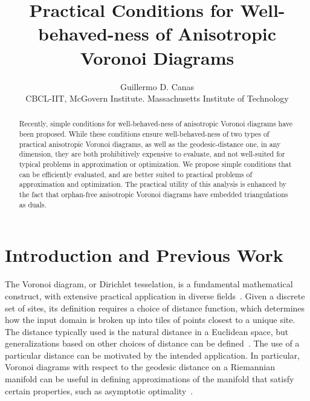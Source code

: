 \documentclass[11pt]{article}
\title{Practical Conditions for Well-behaved-ness of Anisotropic Voronoi Diagrams}
\author{Guillermo D. Canas\\
CBCL-IIT, McGovern Institute.
Massachusetts Institute of Technology\\
}
\date{}
\begin{document}
\maketitle


\begin{abstract}
Recently, simple conditions for well-behaved-ness of anisotropic Voronoi diagrams have been proposed. 
While these conditions ensure well-behaved-ness of two types of practical anisotropic Voronoi diagrams, as well as the geodesic-distance one, 
in any dimension, 
they are both prohibitively expensive to evaluate, and not well-suited for typical problems in approximation or optimization. 
We propose simple conditions that can be efficiently evaluated, and are better suited to practical problems of approximation and optimization. The practical utility of this analysis is enhanced by the fact that orphan-free anisotropic Voronoi diagrams have embedded triangulations as duals. 
\end{abstract}



\section{Introduction and Previous Work}



The Voronoi diagram, or Dirichlet tesselation, is a fundamental mathematical construct, with extensive practical application in diverse fields~\cite{Aurenhammer91}. 
Given a discrete set of sites, its definition requires a choice of distance function, which determines how the input domain is broken up into tiles of points closest to a unique site. 
The distance typically used is the natural distance in a Euclidean space, but generalizations based on other choices of distance can be defined~\cite{Power,DW,Power2,LS,LL2000}. 
The use of a particular distance can be motivated by the intended application. 
In particular, Voronoi diagrams with respect to the geodesic distance on a Riemannian manifold can be useful in defining approximations of the manifold that satisfy certain properties, 
	such as asymptotic optimality~\cite{enets,LL2000}. 
\end{document}
